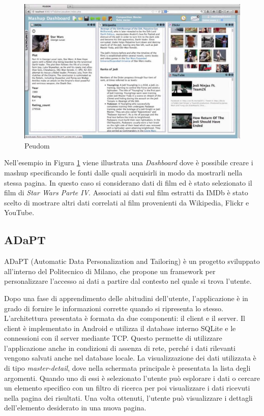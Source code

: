 \begin{figure}[ht]
	\centering
	\includegraphics[width=\textwidth]{2-preliminari/Immagini/peudom.jpg}
	\caption{Peudom}\label{fig:peudom}
\end{figure}

Nell'esempio in Figura \ref{fig:peudom} viene illustrata una \emph{Dashboard} dove è possibile creare i mashup specificando le fonti dalle quali acquisirli in modo da mostrarli nella stessa pagina. In questo caso si considerano dati di film ed è stato selezionato il film di \emph{Star Wars Parte IV}. Associati ai dati sul film estratti da IMDb è stato scelto di mostrare altri dati correlati al film provenienti da Wikipedia, Flickr e YouTube.

\subsection*{ADaPT}

ADaPT \cite{6816749_ADaPT} (Automatic Data Personalization and Tailoring) è un progetto sviluppato all'interno del Politecnico di Milano, che propone un framework per personalizzare l'accesso ai dati a partire dal contesto nel quale si trova l'utente. 

Dopo una fase di apprendimento delle abitudini dell'utente, l'applicazione è in grado di fornire le informazioni corrette quando si ripresenta lo stesso.
L'architettura presentata è formata da due componenti: il client e il server.
Il client è implementato in Android e utilizza il database interno SQLite e le connessioni con il server mediante TCP. Questo permette di utilizzare l'applicazione anche in condizioni di assenza di rete, perché i dati rilevanti vengono salvati anche nel database locale. La visualizzazione dei dati utilizzata è di tipo \emph{master-detail}, %
dove nella schermata principale è presentata la lista degli argomenti. Quando uno di essi è selezionato l'utente può esplorare i dati o cercare un elemento specifico con un filtro di ricerca per poi visualizzare i dati ricevuti nella pagina dei risultati. Una volta ottenuti, l'utente può visualizzare i dettagli dell'elemento desiderato in una nuova pagina. 

